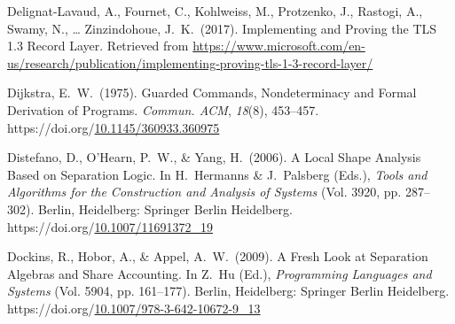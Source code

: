 \documentclass[12pt,twoside]{article}
\begin{document}
{\begin{thebibliography}{222}
\mdbibitemlabel{}Delignat-Lavaud, A., Fournet, C., Kohlweiss, M., Protzenko, J., Rastogi, A., Swamy, N., … Zinzindohoue, J.~K.~(2017). Implementing and Proving the TLS 1.3 Record Layer. Retrieved from \href{https://www.microsoft.com/en-us/research/publication/implementing-proving-tls-1-3-record-layer/}{{\ttfamily https://\hspace{0pt}www.\hspace{0pt}microsoft.\hspace{0pt}com/\hspace{0pt}en-\hspace{0pt}us/\hspace{0pt}research/\hspace{0pt}publication/\hspace{0pt}implementing-\hspace{0pt}proving-\hspace{0pt}tls-\hspace{0pt}1-\hspace{0pt}3-\hspace{0pt}record-\hspace{0pt}layer/\hspace{0pt}}}\label{delignat-lavaud_implementing_2017}%

\mdbibitemlabel{}Dijkstra, E.~W.~(1975). Guarded Commands, Nondeterminacy and Formal Derivation of Programs. \emph{Commun. ACM}, \emph{18}(8), 453–457. https://doi.org/\href{https://dx.doi.org/10.1145/360933.360975}{10.1145/360933.360975}\label{dijkstra_guarded_1975}%

\mdbibitemlabel{}Distefano, D., O’Hearn, P.~W., \& Yang, H.~(2006). A Local Shape Analysis Based on Separation Logic. In H.~Hermanns \& J.~Palsberg (Eds.), \emph{Tools and Algorithms for the Construction and Analysis of Systems} (Vol. 3920, pp. 287–302). Berlin, Heidelberg: Springer Berlin Heidelberg. https://doi.org/\href{https://dx.doi.org/10.1007/11691372_19}{10.1007/11691372\_19}\label{hermanns_local_2006}%

\mdbibitemlabel{}Dockins, R., Hobor, A., \& Appel, A.~W.~(2009). A Fresh Look at Separation Algebras and Share Accounting. In Z.~Hu (Ed.), \emph{Programming Languages and Systems} (Vol. 5904, pp. 161–177). Berlin, Heidelberg: Springer Berlin Heidelberg. https://doi.org/\href{https://dx.doi.org/10.1007/978-3-642-10672-9_13}{10.1007/978-3-642-10672-9\_13}\label{hutchison_fresh_2009}%


\end{thebibliography}}
\end{document}
